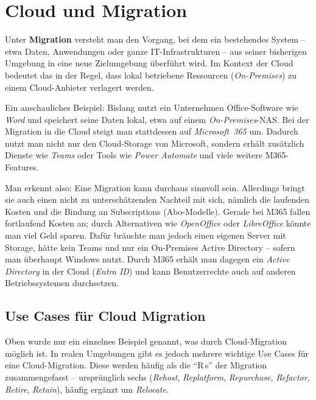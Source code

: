 \section{Cloud und Migration}
Unter \textbf{Migration} versteht man den Vorgang, bei dem ein bestehendes System -- etwa Daten, Anwendungen oder ganze IT-Infrastrukturen -- aus seiner bisherigen Umgebung in eine neue Zielumgebung überführt wird. Im Kontext der Cloud bedeutet das in der Regel, dass lokal betriebene Ressourcen (\textit{On-Premises}) zu einem Cloud-Anbieter verlagert werden.

Ein anschauliches Beispiel: Bislang nutzt ein Unternehmen Office-Software wie \textit{Word} und speichert seine Daten lokal, etwa auf einem \textit{On-Premises}-NAS. Bei der Migration in die Cloud steigt man stattdessen auf \textit{Microsoft~365} um. Dadurch nutzt man nicht nur den Cloud-Storage von Microsoft, sondern erhält zusätzlich Dienste wie \textit{Teams} oder Tools wie \textit{Power Automate} und viele weitere M365-Features.

Man erkennt also: Eine Migration kann durchaus sinnvoll sein. Allerdings bringt sie auch einen nicht zu unterschätzenden Nachteil mit sich, nämlich die laufenden Kosten und die Bindung an Subscriptions (Abo-Modelle). Gerade bei M365 fallen fortlaufend Kosten an; durch Alternativen wie \textit{OpenOffice} oder \textit{LibreOffice} könnte man viel Geld sparen. Dafür bräuchte man jedoch einen eigenen Server mit Storage, hätte kein Teams und nur ein On-Premises Active Directory -- sofern man überhaupt Windows nutzt. Durch M365 erhält man dagegen ein \textit{Active Directory} in der Cloud (\textit{Entra ID}) und kann Benutzerrechte auch auf anderen Betriebssystemen durchsetzen.

\subsection{Use Cases für Cloud Migration}
Oben wurde nur ein einzelnes Beispiel genannt, was durch Cloud-Migration möglich ist. In realen Umgebungen gibt es jedoch mehrere wichtige Use Cases für eine Cloud-Migration. %
Diese werden häufig als die \enquote{R\,s} der Migration zusammengefasst -- ursprünglich sechs (\textit{Rehost}, \textit{Replatform}, \textit{Repurchase}, \textit{Refactor}, \textit{Retire}, \textit{Retain}), häufig ergänzt um \textit{Relocate}.

